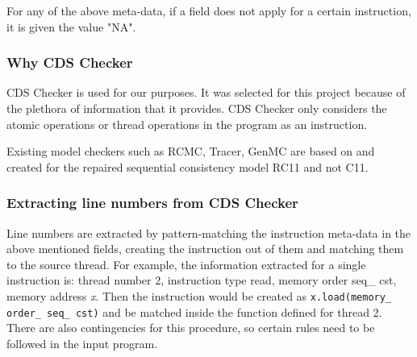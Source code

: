 \par
For any of the above meta-data, if a field does not apply for a certain instruction, it is given the value "NA".

\subsubsection{Why CDS Checker}
CDS Checker is used for our purposes. It was selected for this project because of the plethora of information that it provides. CDS Checker only considers the atomic operations or thread operations in the program as an instruction.

Existing model checkers such as RCMC, Tracer, GenMC are based on and created for the repaired sequential consistency model RC11 and not C11. 

\subsubsection{Extracting line numbers from CDS Checker}
Line numbers are extracted by pattern-matching the instruction meta-data in the above mentioned fields, creating the instruction out of them and matching them to the source thread. For example, the information extracted for a single instruction is: thread number 2, instruction type read, memory order seq\_ cst, memory address \textit{x}. Then the instruction would be created as \texttt{x.load(memory\_ order\_ seq\_ cst)} and be matched inside the function defined for thread 2. There are also contingencies for this procedure, so certain rules need to be followed in the input program.

